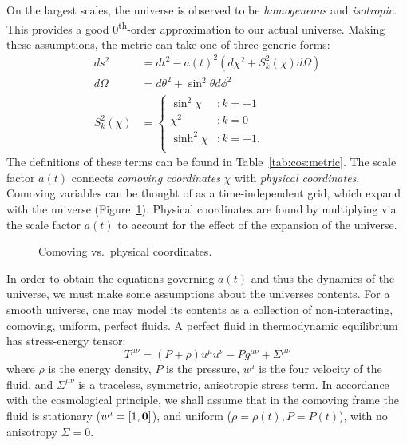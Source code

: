 On the largest scales, the universe is observed to be {\em homogeneous\/} and {\em isotropic}. This provides a good 0\textsuperscript{th}-order approximation to our actual universe. Making these assumptions, the metric can take one of three generic forms:
\begin{align}
  ds^2 &= dt^2 - a{(t)}^2\left( d\chi^2 + S_k^2{(\chi)} d\Omega \right)
  \label{eqn:cos:FRW_metric}\\
  d\Omega &= d\theta^2 + \sin^2\theta d\phi^2
  \label{eqn:cos:angle_element}\\
  S_k^2(\chi) &=
  \left\{
  \begin{array}{rl}
    \sin^2\chi &: k=+1 \\
    \chi^2 &: k=0 \\
    \sinh^2\chi &: k=-1. \\
  \end{array}
  \right.\label{eqn:cos:S_def}
\end{align}
The definitions of these terms can be found in Table~\ref{tab:cos:metric}. The scale factor $a(t)$ connects {\em comoving coordinates\/} $\chi$ with {\em physical coordinates}. Comoving variables can be thought of as a time-independent grid, which expand with the universe (Figure~\ref{fig:cos:comoving_vs_physical}). Physical coordinates are found by multiplying via the scale factor $a(t)$ to account for the effect of the expansion of the universe.
\begin{figure}
  \centering
  
  \caption{Comoving vs.\ physical coordinates.\label{fig:cos:comoving_vs_physical}}
\end{figure}




In order to obtain the equations governing $a(t)$ and thus the dynamics of the universe, we must make some assumptions about the universes contents. For a smooth universe, one may model its contents as a collection of non-interacting, comoving, uniform, perfect fluids. A perfect fluid in thermodynamic equilibrium has stress-energy tensor:
\begin{equation}
  T^{\mu\nu} = (P+\rho)u^{\mu}u^{\nu} - P g^{\mu\nu} + \Sigma^{\mu\nu}
  \label{eqn:cos:SET_perfect_fluid}
\end{equation}
where $\rho$ is the energy density, $P$ is the pressure, $u^\mu$ is the four velocity of the fluid, and $\Sigma^{\mu\nu}$ is a traceless, symmetric, anisotropic stress term. In accordance with the cosmological principle, we shall assume that in the comoving frame the fluid is stationary ($u^\mu = [1,\mathbf{0}]$), and uniform ($\rho=\rho(t),P=P(t)$), with no anisotropy $\Sigma=0$.  


